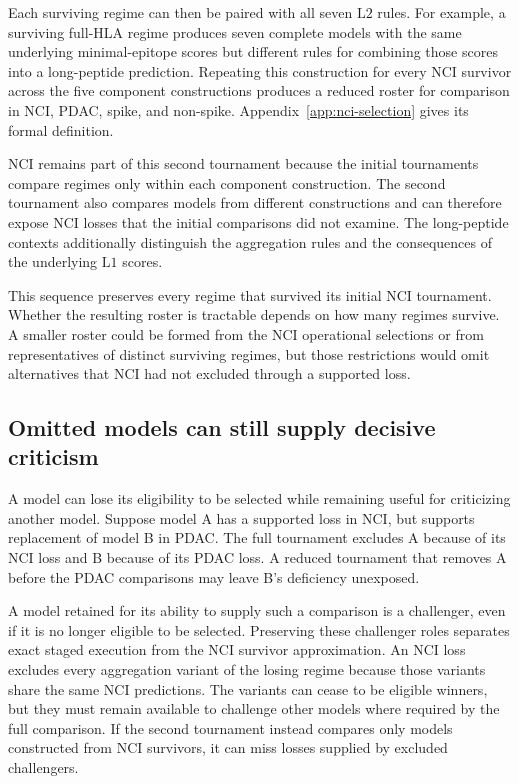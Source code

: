 \documentclass[11pt]{article}
\begin{document}
Each surviving regime can then be paired with all seven \(\mathrm{L2}\)
rules. For example, a surviving full-HLA regime produces seven complete
models with the same underlying minimal-epitope scores but different rules for
combining those scores into a long-peptide prediction. Repeating this
construction for every NCI survivor across the five component constructions
produces a reduced roster for comparison in NCI, PDAC, spike, and non-spike.
Appendix~\ref{app:nci-selection} gives its formal definition.

NCI remains part of this second tournament because the initial tournaments
compare regimes only within each component construction. The second tournament
also compares models from different constructions and can therefore expose NCI
losses that the initial comparisons did not examine. The long-peptide contexts
additionally distinguish the aggregation rules and the consequences of the
underlying \(\mathrm{L1}\) scores.

This sequence preserves every regime that survived its initial NCI tournament.
Whether the resulting roster is tractable depends on how many regimes survive.
A smaller roster could be formed from the NCI operational selections or from
representatives of distinct surviving regimes, but those restrictions would
omit alternatives that NCI had not excluded through a supported loss.

\subsection{Omitted models can still supply decisive criticism}

A model can lose its eligibility to be selected while remaining useful for
criticizing another model. Suppose model A has a supported loss in NCI, but
supports replacement of model B in PDAC. The full tournament excludes A
because of its NCI loss and B because of its PDAC loss. A reduced tournament
that removes A before the PDAC comparisons may leave B's deficiency unexposed.

A model retained for its ability to supply such a comparison is a challenger,
even if it is no longer eligible to be selected. Preserving these challenger
roles separates exact staged execution from the NCI survivor approximation.
An NCI loss excludes every aggregation variant of the losing regime because
those variants share the same NCI predictions. The variants can cease to be
eligible winners, but they must remain available to challenge other models
where required by the full comparison. If the second tournament instead
compares only models constructed from NCI survivors, it can miss losses
supplied by excluded challengers.
\end{document}
